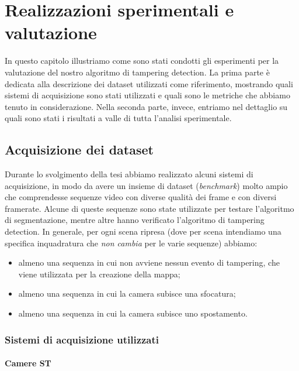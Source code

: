 \chapter{Realizzazioni sperimentali e valutazione}
\label{ProveSperimentali}
\thispagestyle{empty}

\vspace{0.5cm}

\noindent In questo capitolo illustriamo come sono stati condotti gli esperimenti per la valutazione del nostro algoritmo di tampering detection.
La prima parte \`e dedicata alla descrizione dei dataset utilizzati come riferimento, mostrando quali sistemi di acquisizione sono stati utilizzati e quali sono le metriche che abbiamo tenuto in considerazione.
Nella seconda parte, invece, entriamo nel dettaglio su quali sono stati i risultati a valle di tutta l'analisi sperimentale. 
\section{Acquisizione dei dataset}
Durante lo svolgimento della tesi abbiamo realizzato alcuni sistemi di acquisizione, in modo da avere un insieme di dataset (\textit{benchmark}) molto ampio che comprendesse sequenze video con diverse qualit\`a dei frame e con diversi framerate.
Alcune di queste sequenze sono state utilizzate per testare l'algoritmo di segmentazione, mentre altre hanno verificato l'algoritmo di tampering detection.
In generale, per ogni scena ripresa (dove per scena intendiamo una specifica inquadratura che \textit{non cambia} per le varie sequenze) abbiamo:
\begin{itemize}
	\item almeno una sequenza in cui non avviene nessun evento di tampering, che viene utilizzata per la creazione della mappa;
	\item almeno una sequenza in cui la camera subisce una sfocatura;
	\item almeno una sequenza in cui la camera subisce uno spostamento.
\end{itemize}
\subsection{Sistemi di acquisizione utilizzati}
\subsubsection{Camere ST}

